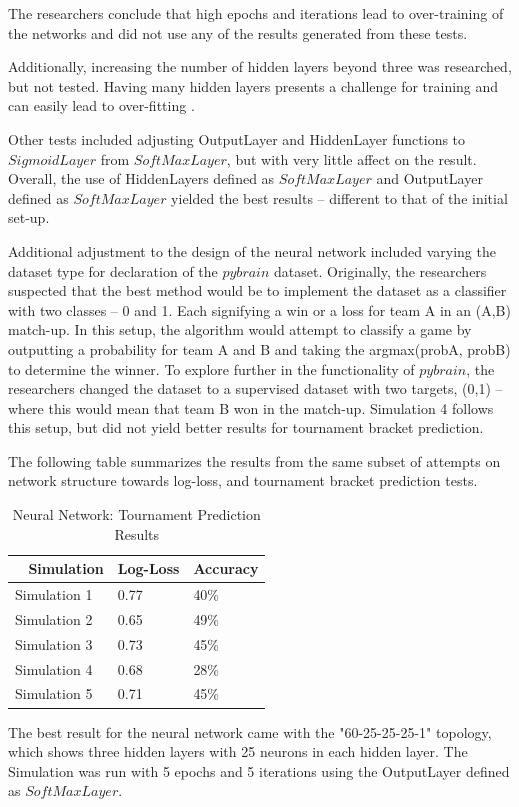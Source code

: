 \documentclass[conference]{IEEEtran}
\begin{document}
{The researchers conclude that high epochs and iterations lead to over-training of the networks and did not use any of the results generated from these tests.

Additionally, increasing the number of hidden layers beyond three was researched, but not tested.
Having many hidden layers presents a challenge for training and can easily lead to over-fitting \cite{bengio2007scaling}.

Other tests included adjusting OutputLayer and HiddenLayer functions to $SigmoidLayer$ from $SoftMaxLayer$, but with very little affect on the result.
Overall, the use of HiddenLayers defined as $SoftMaxLayer$ and OutputLayer defined as $SoftMaxLayer$ yielded the best results -- different to that of the initial set-up.

Additional adjustment to the design of the neural network included varying the dataset type for declaration of the $pybrain$ dataset.
Originally, the researchers suspected that the best method would be to implement the dataset as a classifier with two classes -- 0 and 1.
Each signifying a win or a loss for team A in an (A,B) match-up.
In this setup, the algorithm would attempt to classify a game by outputting a probability for team A and B and taking the argmax(probA, probB) to determine the winner.
To explore further in the functionality of $pybrain$, the researchers changed the dataset to a supervised dataset with two targets, (0,1) -- where this would mean that team B won in the match-up.
Simulation 4 follows this setup, but did not yield better results for tournament bracket prediction.

The following table summarizes the results from the same subset of attempts on network structure towards log-loss, and tournament bracket prediction tests.

\begin{table}[H]
	\centering
    \begin{tabular}{|l|l|l|}
    \hline
    ~   \textbf{Simulation} & \textbf{Log-Loss} & \textbf{Accuracy}\\ \hline
    	Simulation 1 		& 0.77 				& 40\%\\ \hline
    	Simulation 2 		& 0.65 				& 49\% \\ \hline
    	Simulation 3 		& 0.73 				& 45\% \\ \hline
    	Simulation 4 		& 0.68 				& 28\% \\ \hline    
    	Simulation 5 		& 0.71 				& 45\% \\ \hline	
    \end{tabular}
    \caption {Neural Network: Tournament Prediction Results}
    \label{tab:nn-pred}
\end{table}
The best result for the neural network came with the "60-25-25-25-1" topology, which shows three hidden layers with 25 neurons in each hidden layer.
The Simulation was run with 5 epochs and 5 iterations using the OutputLayer defined as $SoftMaxLayer$.

}
\end{document}
